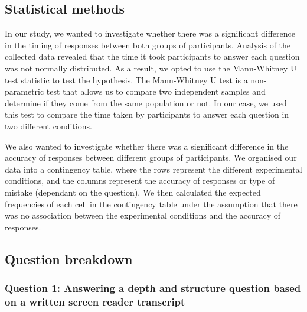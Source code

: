 \documentclass{l4proj}
\begin{document}
\subsection{Statistical methods}

In our study, we wanted to investigate whether there was a significant difference in the timing of responses between both groups of participants. Analysis of the collected data revealed that the time it took participants to answer each question was not normally distributed. As a result, we opted to use the Mann-Whitney U test statistic to test the hypothesis.
The Mann-Whitney U test is a non-parametric test that allows us to compare two independent samples and determine if they come from the same population or not. In our case, we used this test to compare the time taken by participants to answer each question in two different conditions.

 We also wanted to investigate whether there was a significant difference in the accuracy of responses between different groups of participants.
We organised our data into a contingency table, where the rows represent the different experimental conditions, and the columns represent the accuracy of responses or type of mistake (dependant on the question). We then calculated the expected frequencies of each cell in the contingency table under the assumption that there was no association between the experimental conditions and the accuracy of responses.

\subsection{Question breakdown}

\subsubsection{Question 1: Answering a depth and structure question based on a written screen reader transcript} \hfill
\end{document}
